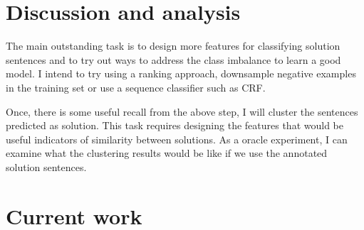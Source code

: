 \documentclass[11pt]{article}
\begin{document}
\section{Discussion and analysis}

The main outstanding task is to design more features for classifying solution sentences and
to try out ways to address the class imbalance to learn a good model. I intend 
to try using a ranking approach, downsample negative examples in the training
set or use a sequence classifier such as CRF.

Once, there is some  useful recall from the above step, I will 
cluster the sentences predicted as solution. This task requires
designing the features that would be useful indicators of similarity between
solutions. As a oracle experiment, I can examine what the clustering results would
be like if we use the annotated solution sentences.

\section{Current work}





\end{document}
